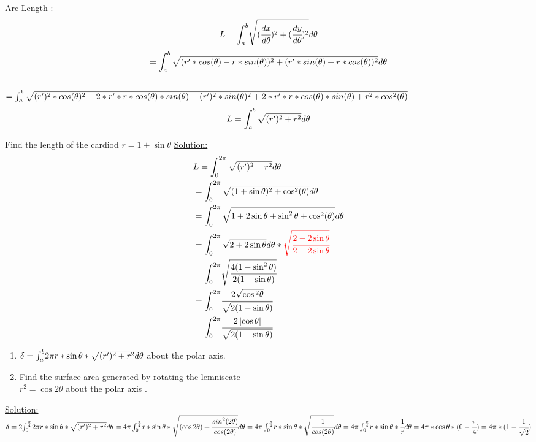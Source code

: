 {\color{smalt(darkpowderblue)}\underline {Arc Length :}}\\
$$L={\Huge \int_{a}^{b}}\sqrt{(\cfrac{dx}{d\theta})^2+(\cfrac{dy}{d\theta})^2} d\theta $$
$$={\Huge \int_{a}^{b}\sqrt{(r'*cos(\theta)-r*sin(\theta))^2+(r'*sin(\theta)+r*cos(\theta))^2 }}d\theta$$\\
 $={\Huge \int_{a}^{b} \sqrt{ (r')^2*cos(\theta)^2 -2*r'*r*cos(\theta)*sin(\theta)+(r')^2*sin(\theta)^2+2*r'*r*cos(\theta)*sin(\theta)+r^2*cos^2(\theta)}}$\\
 $$L= {\Huge \int_{a}^{b} \sqrt{(r')^2+r^2}d\theta}$$
\begin{example}
Find the length of the cardiod $r=1+\sin{\theta}$
{\color{smalt(darkpowderblue)}\underline {Solution:}}\\
\begin{align*}
    & L= {\Huge \int_{0}^{2\pi} \sqrt{(r')^2+r^2}d\theta}\\
    & = {\Huge \int_{0}^{2\pi} \sqrt{(1+\sin{\theta})^2+\cos^2(\theta)}d\theta }\\
    &={\Huge \int_{0}^{2\pi} \sqrt{1+2\sin{\theta}+\sin^2{\theta}+\cos^2(\theta)}d\theta }\\
    &={\Huge \int_{0}^{2\pi} \sqrt{2+2\sin{\theta}}d\theta }*\color{red}\sqrt{\cfrac{2-2\sin{\theta}}{2-2\sin{\theta}}}\\
     &={\Huge \int_{0}^{2\pi}} \sqrt{\cfrac{4(1-\sin^2{\theta})}{2(1-\sin{\theta})}}\\
        &={\Huge \int_{0}^{2\pi}} {\cfrac{2\sqrt{\cos{^2{\theta}}}}{\sqrt{2(1-\sin{\theta})}}}\\
         &={\Huge \int_{0}^{2\pi}} {\cfrac{2\left|  {\cos{{\theta}}}\right|}{\sqrt{2(1-\sin{\theta})}}}\\
\end{align*}
\end{example}
\noindent{\color{smalt(darkpowderblue)}\rule{\linewidth}{.2mm}}
\begin{example}
\begin{enumerate}
    \item $\delta={\Huge \int_{a}^{b}} {2\pi r*\sin{\theta}*\sqrt{(r')^2+r^2}d\theta}$ about the polar axis.
    \item Find the surface area generated by rotating the lemniscate\\ $r^2=\cos{2\theta}$ about the polar axis .
\end{enumerate}
{\color{smalt(darkpowderblue)}\underline {Solution:}}\\
$\delta=2{\Huge \int_{0}^{\frac{\pi}{4}}} {2\pi r*\sin{\theta}*\sqrt{(r')^2+r^2}d\theta}\\
={\Huge 4\pi \int_{0}^{\frac{\pi}{4}}} { r*\sin{\theta}*\sqrt{(\cos{2\theta})+\cfrac{sin^2(2\theta)}{cos(2\theta)}}d\theta}\\
={\Huge 4\pi \int_{0}^{\frac{\pi}{4}}} { r*\sin{\theta}*\sqrt{\cfrac{1}{cos(2\theta)}}d\theta}\\
={\Huge 4\pi \int_{0}^{\frac{\pi}{4}}} { r*\sin{\theta}*\cfrac{1}{r}d\theta}\\
=4\pi *\cos{\theta} *(0-\cfrac{\pi}{4})\\
=4\pi *(1-\cfrac{1}{\sqrt{2}})$
\end{example}
\setcounter{chapter}{11}
